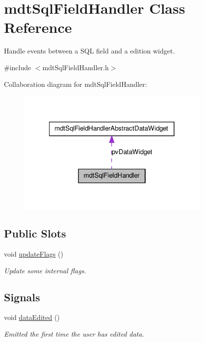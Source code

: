 \hypertarget{classmdt_sql_field_handler}{
\section{mdtSqlFieldHandler Class Reference}
\label{classmdt_sql_field_handler}
}


Handle events between a SQL field and a edition widget.  




{\ttfamily \#include $<$mdtSqlFieldHandler.h$>$}



Collaboration diagram for mdtSqlFieldHandler:\nopagebreak
\begin{figure}[H]
\begin{center}
\leavevmode
\includegraphics[width=270pt]{classmdt_sql_field_handler__coll__graph}
\end{center}
\end{figure}
\subsection*{Public Slots}
\begin{DoxyCompactItemize}
\item 
void \hyperlink{classmdt_sql_field_handler_a7bb4e75ab209bdd2609cf458b5ce8868}{updateFlags} ()
\begin{DoxyCompactList}\small\item\em Update some internal flags. \end{DoxyCompactList}\end{DoxyCompactItemize}
\subsection*{Signals}
\begin{DoxyCompactItemize}
\item 
\hypertarget{classmdt_sql_field_handler_a111eebc8905151a5938950e23e61ff90}{
void \hyperlink{classmdt_sql_field_handler_a111eebc8905151a5938950e23e61ff90}{dataEdited} ()}
\label{classmdt_sql_field_handler_a111eebc8905151a5938950e23e61ff90}

\begin{DoxyCompactList}\small\item\em Emitted the first time the user has edited data. \end{DoxyCompactList}\end{DoxyCompactItemize}
